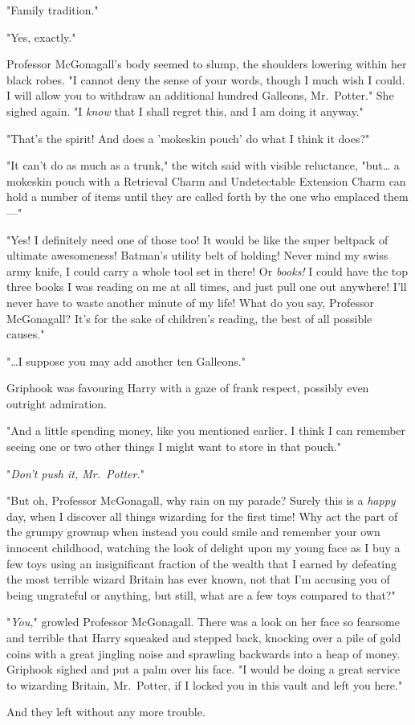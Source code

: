 "Family tradition."

"Yes, exactly."

Professor McGonagall's body seemed to slump, the shoulders lowering within her black robes. "I cannot deny the sense of your words, though I much wish I could. I will allow you to withdraw an additional hundred Galleons, Mr.~Potter." She sighed again. "I \emph{know} that I shall regret this, and I am doing it anyway."

"That's the spirit! And does a 'mokeskin pouch' do what I think it does?"

"It can't do as much as a trunk," the witch said with visible reluctance, "but{\ldots} a mokeskin pouch with a Retrieval Charm and Undetectable Extension Charm can hold a number of items until they are called forth by the one who emplaced them---"

"Yes! I definitely need one of those too! It would be like the super beltpack of ultimate awesomeness! Batman's utility belt of holding! Never mind my swiss army knife, I could carry a whole tool set in there! Or \emph{books!} I could have the top three books I was reading on me at all times, and just pull one out anywhere! I'll never have to waste another minute of my life! What do you say, Professor McGonagall? It's for the sake of children's reading, the best of all possible causes."

"{\ldots}I suppose you may add another ten Galleons."

Griphook was favouring Harry with a gaze of frank respect, possibly even outright admiration.

"And a little spending money, like you mentioned earlier. I think I can remember seeing one or two other things I might want to store in that pouch."

"\emph{Don't push it, Mr.~Potter.}"

"But oh, Professor McGonagall, why rain on my parade? Surely this is a \emph{happy} day, when I discover all things wizarding for the first time! Why act the part of the grumpy grownup when instead you could smile and remember your own innocent childhood, watching the look of delight upon my young face as I buy a few toys using an insignificant fraction of the wealth that I earned by defeating the most terrible wizard Britain has ever known, not that I'm accusing you of being ungrateful or anything, but still, what are a few toys compared to that?"

"\emph{You,}" growled Professor McGonagall. There was a look on her face so fearsome and terrible that Harry squeaked and stepped back, knocking over a pile of gold coins with a great jingling noise and sprawling backwards into a heap of money. Griphook sighed and put a palm over his face. "I would be doing a great service to wizarding Britain, Mr.~Potter, if I locked you in this vault and left you here."

And they left without any more trouble.